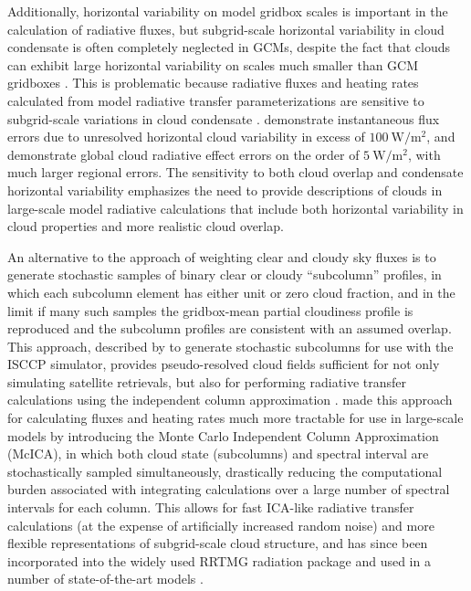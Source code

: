 Additionally, horizontal variability on model gridbox scales is
important in the calculation of radiative fluxes, but subgrid-scale
horizontal variability in cloud condensate is often completely neglected
in GCMs, despite the fact that clouds can exhibit large horizontal
variability on scales much smaller than GCM gridboxes
\citep[e.g.,][]{stephens_and_platt_1987}. This is problematic because
radiative fluxes and heating rates calculated from model radiative
transfer parameterizations are sensitive to subgrid-scale variations in
cloud condensate
\citep[e.g.,][]{barker_et_al_1999, wu_and_liang_2005, oreopoulos_et_al_2012}.
\citet{barker_et_al_1999} demonstrate instantaneous flux errors due to
unresolved horizontal cloud variability in excess of
\(100~\textrm{W}/\textrm{m}^2\), and \citet{oreopoulos_et_al_2012}
demonstrate global cloud radiative effect errors on the order of
\(5~\textrm{W}/\textrm{m}^2\), with much larger regional errors. The
sensitivity to both cloud overlap and condensate horizontal variability
emphasizes the need to provide descriptions of clouds in large-scale
model radiative calculations that include both horizontal variability in
cloud properties and more realistic cloud overlap.

An alternative to the approach of weighting clear and cloudy sky fluxes
is to generate stochastic samples of binary clear or cloudy
``subcolumn'' profiles, in which each subcolumn element has either unit
or zero cloud fraction, and in the limit if many such samples the
gridbox-mean partial cloudiness profile is reproduced and the subcolumn
profiles are consistent with an assumed overlap. This approach,
described by \citet{klein_and_jakob_1999} to generate stochastic
subcolumns for use with the ISCCP simulator, provides pseudo-resolved
cloud fields sufficient for not only simulating satellite retrievals,
but also for performing radiative transfer calculations using the
independent column approximation \citep[ICA;][]{cahalan_et_al_1994}.
\citet{pincus_et_al_2003} made this approach for calculating fluxes and
heating rates much more tractable for use in large-scale models by
introducing the Monte Carlo Independent Column Approximation (McICA), in
which both cloud state (subcolumns) and spectral interval are
stochastically sampled simultaneously, drastically reducing the
computational burden associated with integrating calculations over a
large number of spectral intervals for each column. This allows for fast
ICA-like radiative transfer calculations (at the expense of artificially
increased random noise) and more flexible representations of
subgrid-scale cloud structure, and has since been incorporated into the
widely used RRTMG radiation package and used in a number of
state-of-the-art models
\citep{iacono_et_al_2008, von_salzen_et_al_2012, neale_et_al_2010a, neale_et_al_2010b, donner_et_al_2011, hogan_et_al_2014}.

